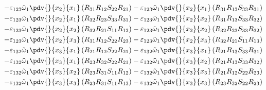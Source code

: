 \begin{equation}
	\begin{split}
		-\varepsilon_{123}\tilde{\omega}_{1}\pdv{}{x_{2}}{x_{1}}\left(R_{31}R_{12}S_{22}R_{21}\right)		-\varepsilon_{123}\tilde{\omega}_{1}\pdv{}{x_{2}}{x_{1}}\left(R_{31}R_{13}S_{33}R_{31}\right)\\
		-\varepsilon_{123}\tilde{\omega}_{1}\pdv{}{x_{2}}{x_{1}}\left(R_{32}R_{23}S_{33}R_{31}\right)		-\varepsilon_{123}\tilde{\omega}_{1}\pdv{}{x_{2}}{x_{2}}\left(R_{31}R_{13}S_{33}R_{32}\right)\\
		-\varepsilon_{123}\tilde{\omega}_{1}\pdv{}{x_{2}}{x_{2}}\left(R_{32}R_{21}S_{11}R_{12}\right)		-\varepsilon_{123}\tilde{\omega}_{1}\pdv{}{x_{2}}{x_{2}}\left(R_{32}R_{23}S_{33}R_{32}\right)\\
		-\varepsilon_{123}\tilde{\omega}_{1}\pdv{}{x_{2}}{x_{3}}\left(R_{31}R_{12}S_{22}R_{23}\right)		-\varepsilon_{123}\tilde{\omega}_{1}\pdv{}{x_{2}}{x_{3}}\left(R_{32}R_{21}S_{11}R_{13}\right)\\
		-\varepsilon_{132}\tilde{\omega}_{1}\pdv{}{x_{3}}{x_{1}}\left(R_{21}R_{12}S_{22}R_{21}\right)		-\varepsilon_{132}\tilde{\omega}_{1}\pdv{}{x_{3}}{x_{1}}\left(R_{21}R_{13}S_{33}R_{31}\right)\\
		-\varepsilon_{132}\tilde{\omega}_{1}\pdv{}{x_{3}}{x_{1}}\left(R_{23}R_{32}S_{22}R_{21}\right)		-\varepsilon_{132}\tilde{\omega}_{1}\pdv{}{x_{3}}{x_{2}}\left(R_{21}R_{13}S_{33}R_{32}\right)\\
		-\varepsilon_{132}\tilde{\omega}_{1}\pdv{}{x_{3}}{x_{2}}\left(R_{23}R_{31}S_{11}R_{12}\right)		-\varepsilon_{132}\tilde{\omega}_{1}\pdv{}{x_{3}}{x_{3}}\left(R_{21}R_{12}S_{22}R_{23}\right)\\
		-\varepsilon_{132}\tilde{\omega}_{1}\pdv{}{x_{3}}{x_{3}}\left(R_{23}R_{31}S_{11}R_{13}\right)		-\varepsilon_{132}\tilde{\omega}_{1}\pdv{}{x_{3}}{x_{3}}\left(R_{23}R_{32}S_{22}R_{23}\right)\\
	\end{split}
\end{equation}

